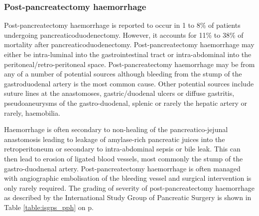 \subsubsection{Post-pancreatectomy haemorrhage}
\label{sec:ch_intro_PPH}
Post-pancreatectomy haemorrhage is reported to occur in 1 to 8\% of patients undergoing pancreaticoduodenectomy. However, it accounts for 11\% to 38\% of mortality after pancreaticoduodenectomy. Post-pancreatectomy haemorrhage may either be intra-luminal into the gastrointestinal tract or intra-abdominal into the peritoneal/retro-peritoneal space. Post-pancreatectomy haemorrhage may be from any of a number of potential sources although bleeding from the stump of the gastroduodenal artery is the most common cause. Other potential sources include suture lines at the anastomoses, gastric/duodenal ulcers or diffuse gastritis, pseudoaneurysms of the gastro-duodenal, splenic or rarely the hepatic artery or rarely, haemobilia.

Haemorrhage is often secondary to non-healing of the pancreatico-jejunal anastomosis leading to leakage of amylase-rich pancreatic juices into the retroperitoneum or secondary to intra-abdominal sepsis or bile leak.\parencite{tien_risk_2005, koukoutsis_haemorrhage_2006, choi_delayed_2004, balladur_bleeding_1996} This can then lead to erosion of ligated blood vessels, most commonly the stump of the gastro-duodnenal artery. Post-pancreatectomy haemorrhage is often managed with angiographic embolisation of the bleeding vessel and surgical intervention is only rarely required. The grading of severity of post-pancreatectomy haemorrhage as described by the International Study Group of Pancreatic Surgery\parencite{wente_postpancreatectomy_2007} is shown in Table \ref{table:isgps_pph} on p\pageref{table:isgps_pph}.

